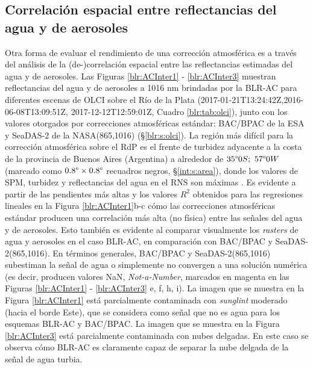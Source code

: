         \subsection{Correlación espacial entre reflectancias del agua y de aerosoles}
        \label{blr:s:results:blrac:correlacionEspacial}
        
            Otra forma de evaluar el rendimiento de una corrección atmosférica es a través del análisis de la (de-)correlación espacial entre las reflectancias estimadas del agua y de aerosoles. Las Figuras \ref{blr:ACInter1} - \ref{blr:ACInter3} muestran reflectancias del agua y de aerosoles a 1016 nm brindadas por la BLR-AC para diferentes escenas de OLCI sobre el Río de la Plata (2017-01-21T13:24:42Z,2016-06-08T13:09:51Z, 2017-12-12T12:59:01Z, Cuadro \ref{blr:tab:olci}), junto con los valores otorgados por correcciones atmosféricas estándar: BAC/BPAC de la ESA y SeaDAS-2 de la NASA(865,1016) (\S \ref{blr:s:olci}). La región más difícil para la corrección atmosférica sobre el RdP es el frente de turbidez adyacente a la costa de la provincia de Buenos Aires (Argentina) a alrededor de $35 \degree0 S; \, \, 57 \degree0 W$ (marcado como $0.8 \degree \times 0.8 \degree$ recuadros negros, \S \ref{int:s:area}), donde los valores de SPM, turbidez y reflectancias del agua en el RNS son máximas \cite{framinan1996}\cite{dogliotti2011}. Es evidente a partir de las pendientes más altas y los valores $R^{2}$ obtenidos para las regresiones lineales en la Figura \ref{blr:ACInter1}b-c cómo las correcciones atmosféricas estándar producen una correlación más alta (no física) entre las señales del agua y de aerosoles. Esto también es evidente al comparar visualmente los \textit{rasters} de agua y aerosoles en el caso BLR-AC, en comparación con BAC/BPAC y SeaDAS-2(865,1016). En términos generales, BAC/BPAC y SeaDAS-2(865,1016) subestiman la señal de agua o simplemente no convergen a una solución numérica (es decir, producen valores NaN, \textit{Not-a-Number}, marcados en magenta en las Figuras \ref{blr:ACInter1} - \ref{blr:ACInter3} e, f, h, i). La imagen que se muestra en la Figura \ref{blr:ACInter1} está parcialmente contaminada con \textit{sunglint} moderado (hacia el borde Este), que se considera como señal que no es agua para los esquemas BLR-AC y BAC/BPAC. La imagen que se muestra en la Figura \ref{blr:ACInter3} está parcialmente contaminada con nubes delgadas. En este caso se observa cómo BLR-AC es claramente capaz de separar la nube delgada de la señal de agua turbia.
    
